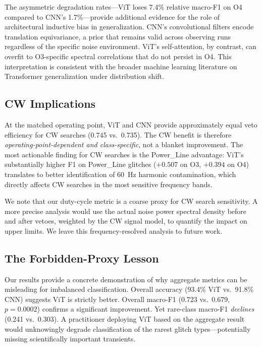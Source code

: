 \documentclass[12pt]{article}
\newcommand{\vitMacroF}{0.723}
\newcommand{\vitRareF}{0.241}
\newcommand{\vitAccuracy}{93.4\%}
\newcommand{\cnnMacroF}{0.679}
\newcommand{\cnnRareF}{0.303}
\newcommand{\cnnAccuracy}{91.8\%}
\newcommand{\pvalueOverall}{0.0002}
\newcommand{\vitDegRel}{7.4\%}
\newcommand{\cnnDegRel}{1.7\%}
\newcommand{\cwEffVit}{0.745}
\newcommand{\cwEffCnn}{0.735}
\newcommand{\powerLineDiffOthree}{+0.507}
\newcommand{\powerLineDiffOfour}{+0.394}
\begin{document}
The asymmetric degradation rates---ViT loses \vitDegRel{} relative macro-F1
on O4 compared to CNN's \cnnDegRel---provide additional evidence for the role
of architectural inductive bias in generalization.
CNN's convolutional filters encode translation equivariance, a prior that
remains valid across observing runs regardless of the specific noise
environment.
ViT's self-attention, by contrast, can overfit to O3-specific spectral
correlations that do not persist in O4.
This interpretation is consistent with the broader machine learning literature
on Transformer generalization under distribution shift.

\subsection{CW Implications}

At the matched operating point, ViT and CNN provide approximately equal
veto efficiency for CW searches (\cwEffVit{} vs.\ \cwEffCnn).
The CW benefit is therefore \emph{operating-point-dependent and
class-specific}, not a blanket improvement.
The most actionable finding for CW searches is the Power\_Line advantage:
ViT's substantially higher F1 on Power\_Line glitches ($\powerLineDiffOthree$ on
O3, $\powerLineDiffOfour$ on O4) translates to better identification of 60~Hz harmonic
contamination, which directly affects CW searches in the most sensitive
frequency bands.

We note that our duty-cycle metric is a coarse proxy for CW search
sensitivity.
A more precise analysis would use the actual noise power spectral density
before and after vetoes, weighted by the CW signal model, to quantify the
impact on upper limits.
We leave this frequency-resolved analysis to future work.

\subsection{The Forbidden-Proxy Lesson}

Our results provide a concrete demonstration of why aggregate metrics can be
misleading for imbalanced classification.
Overall accuracy (\vitAccuracy{} ViT vs.\ \cnnAccuracy{} CNN) suggests ViT is
strictly better.
Overall macro-F1 (\vitMacroF{} vs.\ \cnnMacroF{}, $p = \pvalueOverall$)
confirms a significant improvement.
Yet rare-class macro-F1 \emph{declines} (\vitRareF{} vs.\ \cnnRareF).
A practitioner deploying ViT based on the aggregate result would unknowingly
degrade classification of the rarest glitch types---potentially missing
scientifically important transients.
\end{document}
